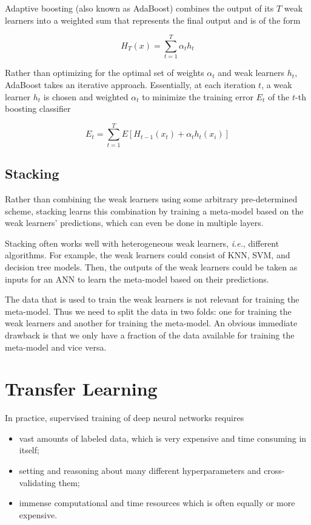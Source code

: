 Adaptive boosting (also known as AdaBoost) \cite{adaboost} combines the output of its $T$ weak learners into a weighted sum that represents the final output and is of the form

\begin{equation}
H_T(x) = \sum_{t=1}^{T} \alpha_t h_t
\end{equation}

Rather than optimizing for the optimal set of weights $\alpha_t$ and weak learners $h_t$, AdaBoost takes an iterative approach. Essentially, at each iteration $t$, a weak learner $h_t$ is chosen and weighted $\alpha_t$ to minimize the training error $E_t$ of the $t$-th boosting classifier

\begin{equation}
E_t = \sum_{t=1}^{T} E[H_{t-1}(x_t) + \alpha_t h_t(x_i)]
\end{equation}

\subsection{Stacking}

Rather than combining the weak learners using some arbitrary pre-determined scheme, stacking learns this combination by training a meta-model based on the weak learners' predictions, which can even be done in multiple layers.

Stacking often works well with heterogeneous weak learners, \textit{i.e.}, different algorithms. For example, the weak learners could consist of \ac{KNN}, \ac{SVM}, and decision tree models. Then, the outputs of the weak learners could be taken as inputs for an \ac{ANN} to learn the meta-model based on their predictions.

The data that is used to train the weak learners is not relevant for training the meta-model. Thus we need to split the data in two folds: one for training the weak learners and another for training the meta-model. An obvious immediate drawback is that we only have a fraction of the data available for training the meta-model and vice versa.

\section{Transfer Learning}
\label{section:transferlearning}

In practice, supervised training of deep neural networks requires

\begin{itemize}
    \item vast amounts of labeled data, which is very expensive and time consuming in itself;
    \item setting and reasoning about many different hyperparameters and cross-validating them;
    \item immense computational and time resources which is often equally or more expensive.
\end{itemize}

